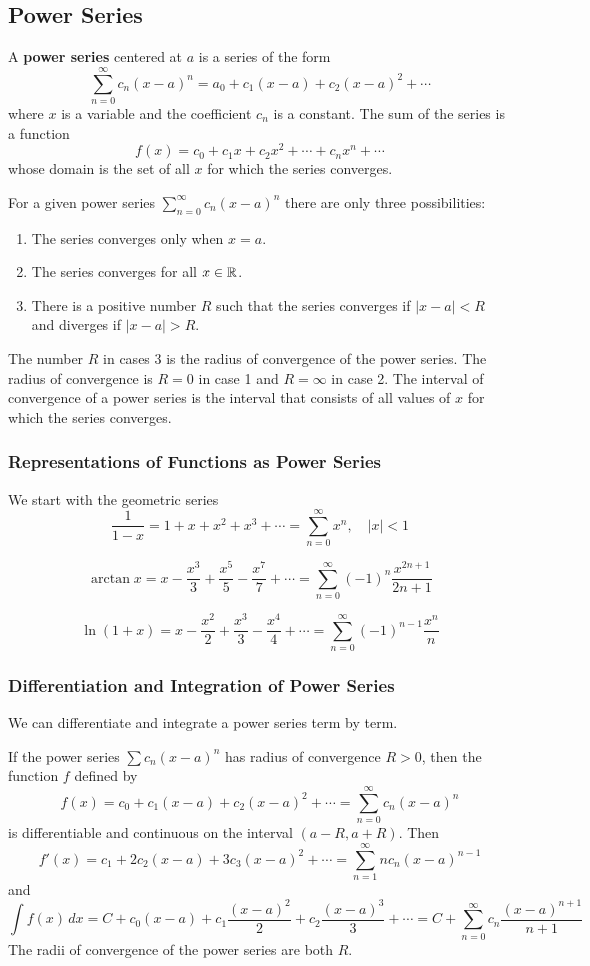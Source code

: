 \subsection{Power Series}
A \textbf{power series} centered at \(a\) is a series of the form
\[\sum_{n=0}^{\infty}c_n(x-a)^n=a_0+c_1(x-a)+c_2(x-a)^2+\cdots\]
where \(x\) is a variable and the coefficient \(c_n\) is a constant.
The sum of the series is a function
\[f(x)=c_0+c_1x+c_2x^2+\cdots+c_nx^n+\cdots\]
whose domain is the set of all \(x\) for which the series converges.
\begin{theorem}
    For a given power series \(\sum_{n=0}^\infty c_n(x-a)^n\) there are only
    three possibilities:
    \begin{enumerate}
        \item The series converges only when \(x=a\).
        \item The series converges for all \(x\in\mathbb{R}\).
        \item There is a positive number \(R\) such that the series converges
        if \(|x-a|<R\) and diverges if \(|x-a|>R\).
    \end{enumerate}
\end{theorem}
The number \(R\) in cases 3 is the radius of convergence of the power series.
The radius of convergence is \(R=0\) in case 1 and \(R=\infty\) in case 2.
The interval of convergence of a power series is the interval that consists of
all values of \(x\) for which the series converges.

\subsubsection*{Representations of Functions as Power Series}
We start with the geometric series
\[\frac{1}{1-x}=1+x+x^2+x^3+\cdots=\sum_{n=0}^\infty x^n,\quad|x|<1\]

\[\arctan x=x-\frac{x^3}{3}+\frac{x^5}{5}-\frac{x^7}{7}+\cdots
=\sum_{n=0}^\infty(-1)^n\frac{x^{2n+1}}{2n+1}\]

\[\ln(1+x)=x-\frac{x^2}{2}+\frac{x^3}{3}-\frac{x^4}{4}+\cdots
=\sum_{n=0}^\infty(-1)^{n-1}\frac{x^n}{n}\]

\subsubsection*{Differentiation and Integration of Power Series}
We can differentiate and integrate a power series term by term.
\begin{theorem}
    If the power series \(\sum c_n(x-a)^n\) has radius of convergence \(R>0\),
    then the function \(f\) defined by
    \[f(x)=c_0+c_1(x-a)+c_2(x-a)^2+\cdots=\sum_{n=0}^\infty c_n(x-a)^n\]
    is differentiable and continuous on the interval \((a-R,a+R)\).
    Then
    \[f'(x)=c_1+2c_2(x-a)+3c_3(x-a)^2+\cdots
    =\sum_{n=1}^\infty nc_n(x-a)^{n-1}\]
    and
    \[\int f(x)\,dx
    =C+c_0(x-a)+c_1\frac{(x-a)^2}{2}+c_2\frac{(x-a)^3}{3}+\cdots
    =C+\sum_{n=0}^\infty c_n\frac{(x-a)^{n+1}}{n+1}\]
    The radii of convergence of the power series are both \(R\).
\end{theorem}